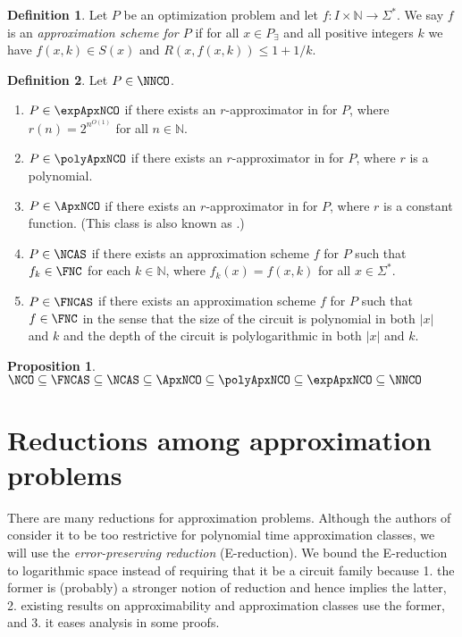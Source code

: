 \documentclass[draft]{article}
\theoremstyle{definition}
\newtheorem{definition}{Definition}
\newtheorem{proposition}{Proposition}
\begin{document}
\begin{definition}
  Let $P$ be an optimization problem and let $f\colon I\times\mathbb{N}\to\Sigma^*$.
  We say $f$ is an \emph{approximation scheme for $P$} if for all $x\in P_\exists$ and all positive integers $k$ we have $f(x, k)\in S(x)$ and $R(x, f(x, k)) \leq 1 + 1 / k$.
\end{definition}

\begin{definition}
  Let $P\in\NNCO$.
  \begin{enumerate}
  \item $P\in\expApxNCO$ if there exists an $r$-approximator in \FNC{} for $P$, where $r(n)=2^{n^{O(1)}}$ for all $n\in\mathbb{N}$.
  \item $P\in\polyApxNCO$ if there exists an $r$-approximator in \FNC{} for $P$, where $r$ is a polynomial.
  \item $P\in\ApxNCO$ if there exists an $r$-approximator in \FNC{} for $P$, where $r$ is a constant function.
    (This class is also known as \NCX.)
  \item $P\in\NCAS$ if there exists an approximation scheme $f$ for $P$ such that $f_k\in\FNC$ for each $k\in\mathbb{N}$, where $f_k(x)=f(x, k)$ for all $x\in\Sigma^*$.
  \item $P\in\FNCAS$ if there exists an approximation scheme $f$ for $P$ such that $f\in\FNC$ in the sense that the size of the circuit is polynomial in both $|x|$ and $k$ and the depth of the circuit is polylogarithmic in both $|x|$ and $k$.
  \end{enumerate}
\end{definition}

\begin{proposition}
  $\NCO \subseteq \FNCAS \subseteq \NCAS \subseteq \ApxNCO \subseteq \polyApxNCO \subseteq \expApxNCO \subseteq \NNCO$
\end{proposition}

\section{Reductions among approximation problems}

There are many reductions for approximation problems.
Although the authors of \cite{ckst95} consider it to be too restrictive for polynomial time approximation classes, we will use the \emph{error-preserving reduction} (E-reduction).
We bound the E-reduction to logarithmic space instead of requiring that it be a \FNC{} circuit family because 1. the former is (probably) a stronger notion of reduction and hence implies the latter, 2. existing results on approximability and approximation classes use the former, and 3. it eases analysis in some proofs.
\end{document}
